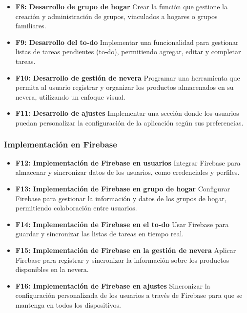 \documentclass{article}
\begin{document}
\begin{flushleft}
\begin{itemize}
    \item \textbf{F8: Desarrollo de grupo de hogar}  
    Crear la funci\'on que gestione la creaci\'on y administraci\'on de grupos, vinculados a hogares o grupos familiares.
    
    \item \textbf{F9: Desarrollo del to-do}  
    Implementar una funcionalidad para gestionar listas de tareas pendientes (to-do), permitiendo agregar, editar y completar tareas.
    
    \item \textbf{F10: Desarrollo de gesti\'on de nevera}  
    Programar una herramienta que permita al usuario registrar y organizar los productos almacenados en su nevera, utilizando un enfoque visual.
    
    \item \textbf{F11: Desarrollo de ajustes}  
    Implementar una secci\'on donde los usuarios puedan personalizar la configuraci\'on de la aplicaci\'on seg\'un sus preferencias.
\end{itemize}

\subsubsection{Implementaci\'on en Firebase}
\begin{itemize}
    \item \textbf{F12: Implementaci\'on de Firebase en usuarios}  
    Integrar Firebase para almacenar y sincronizar datos de los usuarios, como credenciales y perfiles.
    
    \item \textbf{F13: Implementaci\'on de Firebase en grupo de hogar}  
    Configurar Firebase para gestionar la informaci\'on y datos de los grupos de hogar, permitiendo colaboraci\'on entre usuarios.
    
    \item \textbf{F14: Implementaci\'on de Firebase en el to-do}  
    Usar Firebase para guardar y sincronizar las listas de tareas en tiempo real.
    
    \item \textbf{F15: Implementaci\'on de Firebase en la gesti\'on de nevera}  
    Aplicar Firebase para registrar y sincronizar la informaci\'on sobre los productos disponibles en la nevera.
    
    \item \textbf{F16: Implementaci\'on de Firebase en ajustes}  
    Sincronizar la configuraci\'on personalizada de los usuarios a trav\'es de Firebase para que se mantenga en todos los dispositivos.
\end{itemize}


\end{flushleft}
\end{document}
